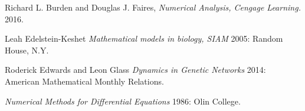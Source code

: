 \documentclass[11pt]{article}
\begin{document}
  \begin{thebibliography}{1}

   Richard L. Burden and Douglas J. Faires, {\em Numerical Analysis,
  Cengage Learning.}  2016.

    Leah Edelstein-Keshet {\em Mathematical models in biology, SIAM} 2005:
  Random House, N.Y.

   Roderick Edwards and Leon Glass {\em Dynamics in Genetic Networks} 2014: American Mathematical Monthly
  Relations.

   {\em Numerical Methods for Differential Equations} 1986: Olin College.

  \end{thebibliography}
\end{document}
